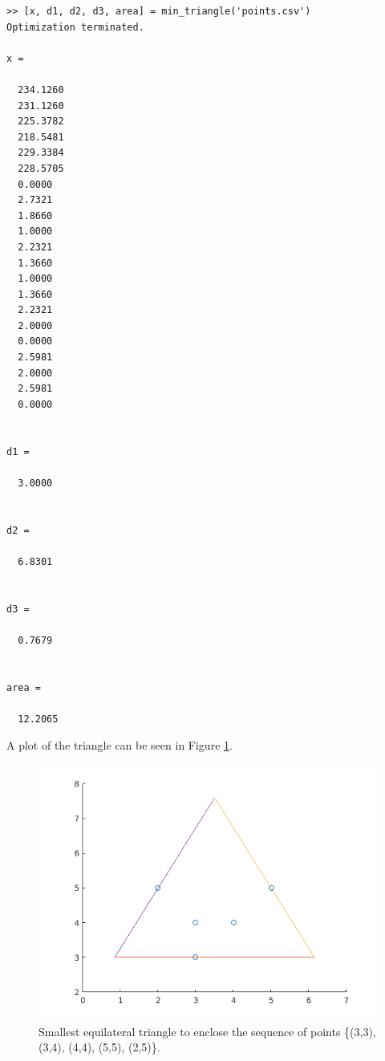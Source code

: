 \documentclass{article}
\begin{document}
\begin{verbatim}
>> [x, d1, d2, d3, area] = min_triangle('points.csv')
Optimization terminated.

x =

  234.1260
  231.1260
  225.3782
  218.5481
  229.3384
  228.5705
  0.0000
  2.7321
  1.8660
  1.0000
  2.2321
  1.3660
  1.0000
  1.3660
  2.2321
  2.0000
  0.0000
  2.5981
  2.0000
  2.5981
  0.0000


d1 =

  3.0000


d2 =

  6.8301


d3 =

  0.7679


area =

  12.2065
\end{verbatim}

\noindent A plot of the triangle can be seen in Figure \ref{fig:triangle}.

\begin{figure} \label{fig:triangle}
	\centering
	\includegraphics[width=0.75\linewidth]{results-1}
	\caption{Smallest equilateral triangle to enclose the sequence of points \{(3,3), (3,4), (4,4), (5,5), (2,5)\}.}
\end{figure}
\end{document}
